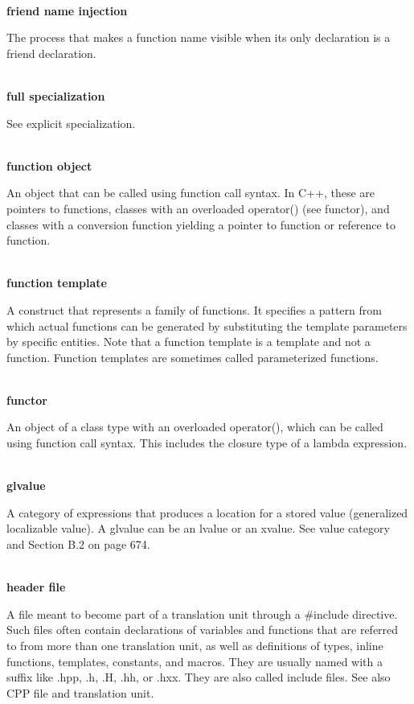 \hspace*{\fill} \\ %
\noindent
\textbf{friend name injection}

The process that makes a function name visible when its only declaration is a friend declaration.

\hspace*{\fill} \\ %
\noindent
\textbf{full specialization}

See explicit specialization.

\hspace*{\fill} \\ %
\noindent
\textbf{function object}

An object that can be called using function call syntax. In C++, these are pointers to functions, classes with an overloaded operator() (see functor), and classes with a conversion function yielding a pointer to function or reference to function.

\hspace*{\fill} \\ %
\noindent
\textbf{function template}

A construct that represents a family of functions. It specifies a pattern from which actual functions can be generated by substituting the template parameters by specific entities. Note that a function template is a template and not a function. Function templates are sometimes called parameterized functions.

\hspace*{\fill} \\ %
\noindent
\textbf{functor}

An object of a class type with an overloaded operator(), which can be called using function call syntax. This includes the closure type of a lambda expression.

\hspace*{\fill} \\ %
\noindent
\textbf{glvalue}

A category of expressions that produces a location for a stored value (generalized localizable value). A glvalue can be an lvalue or an xvalue. See value category and Section B.2 on page 674.

\hspace*{\fill} \\ %
\noindent
\textbf{header file}

A file meant to become part of a translation unit through a \#include directive. Such files often contain declarations of variables and functions that are referred to from more than one translation unit, as well as definitions of types, inline functions, templates, constants, and macros. They are usually named with a suffix like .hpp, .h, .H, .hh, or .hxx. They are also called include files. See also CPP file and translation unit.

